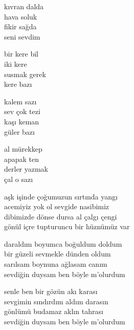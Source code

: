 \documentclass[10pt, openright, oneside]{memoir}
\theoremstyle{definition}
\begin{document}
\vspace*{\fill}
%
\newpage
{}
\vspace*{\fill}
\settowidth{\versewidth}{derler yazmak}
\begin{cverse}
  kıvran dalda \\
  hava soluk \\
  fikir sağda \\
  seni sevdim

  bir kere bil \\
  iki kere \\
  susmak gerek \\
  kere bazı

  kalem sazı \\
  sev çok tezi \\
  kaşı keman \\
  güler bazı

  al mürekkep \\
  apapak ten \\
  derler yazmak \\
  çal o sazı \\
\end{cverse}
\vspace*{\fill}
%
\newpage
{}
\vspace*{\fill}
\settowidth{\versewidth}{gönül içre tupturuncu bir hüznümüz var}
\begin{cverse}
  aşk işinde çoğumuzun sırtında yangı \\
  acemiyiz yok ol sevgide nasibimiz \\
  dibimizde dönse dursa al çalgı çengi \\
  gönül içre tupturuncu bir hüznümüz var \\
\end{cverse}
\vspace*{\fill}
%
\newpage
{}
\vspace*{\fill}
\settowidth{\versewidth}{sevdiğin duysam ben böyle m'olurdum}
\begin{cverse}
  daraldım boyumca boğuldum doldum \\
  bir güzeli sevmekle dünden oldum \\
  sarılsam boynuna ağlasam canım \\
  sevdiğin duysam ben böyle m'olurdum

  senle ben bir gözün akı karası \\
  sevgimin sındırdım aldım darasın \\
  gönlümü budamaz aklın tahrası \\
  sevdiğin duysam ben böyle m'olurdum \\
\end{cverse}
\end{document}
